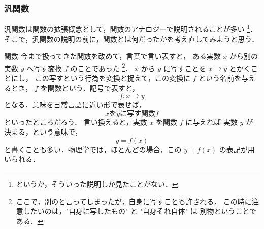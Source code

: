             \subsubsection{汎関数}
                \begin{mycomment}
                    汎関数は関数の拡張概念として，関数のアナロジーで説明されることが多い
                        \footnote{
                            というか，そういった説明しか見たことがない．
                        }．
                    そこで，汎関数の説明の前に，関数とは何だったかを考え直してみようと思う．
                \end{mycomment}

                \begin{mysmallsec}{関数}
                    今まで扱ってきた関数を改めて，言葉で言い表すと，
                    ある実数 $x$ から別の実数 $y$ へ写す変換 $f$ のことであった
                        \footnote{
                            ここで，別のと言ってしまったが，自身に写すことも許される．
                            この時に注意したいのは，"自身に写したもの" と "自身それ自体" は
                            別物ということである．
                        }．
                    $x$ から $y$ に写すことを $x \to y$ とかくことにし，
                    この写すという行為を変換と捉えて，この変換に $f$ という名前を与えるとき，
                    $f$ を関数という．記号で表すと，
                        \begin{equation*}
                            f:x \to y
                        \end{equation*}
                    となる．意味を日常言語に近い形で表せば，
                        \begin{equation*}
                            x \mbox{を} y \mbox{に写す関数} f
                        \end{equation*}
                    といったところだろう．
                    言い換えると，実数 $x$ を関数 $f$ に与えれば 実数 $y$ が決まる，という意味で，
                        \begin{equation*}
                            y = f(x)
                        \end{equation*}
                    と書くことも多い．物理学では，ほとんどの場合，この $y=f(x)$ の表記が用いられる．
                \end{mysmallsec}


